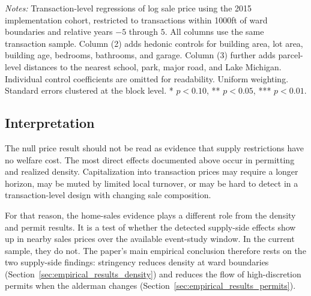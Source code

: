 \begin{table}[htbp]
    \caption{Effect of Alderman Stringency on Home Sale Prices}
    \label{tab:did_sales_2015_current}

    

    \footnotesize
    \textit{Notes:} Transaction-level regressions of log sale price using the 2015 implementation cohort, restricted to transactions within 1000ft of ward boundaries and relative years $-5$ through $5$. All columns use the same transaction sample. Column (2) adds hedonic controls for building area, lot area, building age, bedrooms, bathrooms, and garage. Column (3) further adds parcel-level distances to the nearest school, park, major road, and Lake Michigan. Individual control coefficients are omitted for readability. Uniform weighting. Standard errors clustered at the block level. * $p<0.10$, ** $p<0.05$, *** $p<0.01$.
\end{table}

\subsection{Interpretation}

The null price result should not be read as evidence that supply restrictions have no welfare cost. The most direct effects documented above occur in permitting and realized density. Capitalization into transaction prices may require a longer horizon, may be muted by limited local turnover, or may be hard to detect in a transaction-level design with changing sale composition.

For that reason, the home-sales evidence plays a different role from the density and permit results. It is a test of whether the detected supply-side effects show up in nearby sales prices over the available event-study window. In the current sample, they do not. The paper's main empirical conclusion therefore rests on the two supply-side findings: stringency reduces density at ward boundaries (Section~\ref{sec:empirical_results_density}) and reduces the flow of high-discretion permits when the alderman changes (Section~\ref{sec:empirical_results_permits}).
